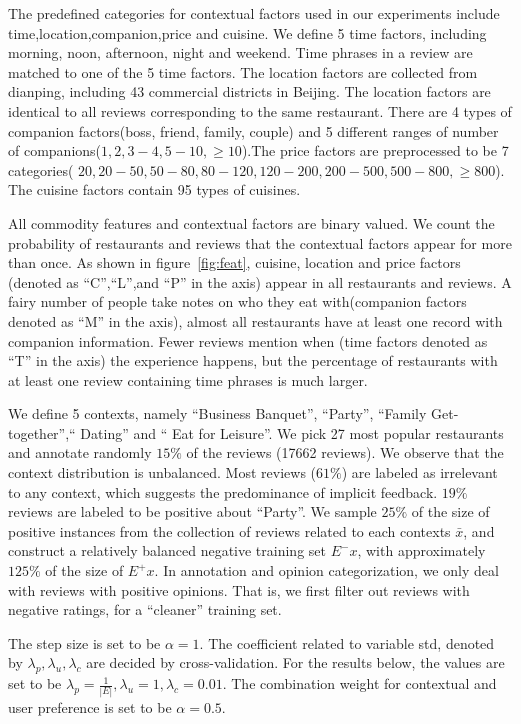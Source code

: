 \documentclass[sigconf]{acmart}
\begin{document}
The predefined categories for contextual factors used in our experiments include time,location,companion,price and cuisine. We define 5 time factors, including morning, noon, afternoon, night and weekend. Time phrases in a review are matched to one of the 5 time factors. The location factors are collected from dianping, including 43 commercial districts in Beijing. The location factors are identical to all reviews corresponding to the same restaurant. There are 4 types of companion factors(boss, friend, family, couple) and 5 different ranges of number of companions($1,2,3-4,5-10,\geq 10$).The price factors are preprocessed to be 7 categories( $20,20-50,50-80,80-120,120-200,200-500,500-800,\geq 800$). The cuisine factors contain 95 types of cuisines.

All commodity features and contextual factors are binary valued. We count the probability of restaurants and reviews that the contextual factors appear for more than once. As shown in figure~\ref{fig:feat}, cuisine, location and price factors (denoted as ``C'',``L'',and ``P'' in the axis) appear in all restaurants and reviews. A fairy number of people take notes on who they eat with(companion factors denoted as ``M'' in the axis), almost all restaurants have at least one record with companion information. Fewer reviews mention when (time factors denoted as ``T'' in the axis) the experience happens, but the percentage of restaurants with at least one review containing time phrases is much larger.

We define 5 contexts, namely ``Business Banquet'', ``Party'', ``Family Get-together'',`` Dating'' and `` Eat for Leisure''. We pick 27 most popular restaurants and annotate randomly $15\%$ of the reviews (17662 reviews). We observe that the context distribution is unbalanced. Most reviews ($61\%$) are labeled as irrelevant to any context, which suggests the predominance of implicit feedback. $19\%$ reviews are labeled to be positive about  ``Party''. We sample $25\%$ of the size of positive instances from the collection of reviews related to each contexts $\bar{x}$, and construct a relatively balanced negative training set  $E^{-}{x}$, with approximately $125\%$ of the size of $E^{+}{x}$. In annotation and opinion categorization, we only deal with reviews with positive opinions. That is, we first filter out reviews with negative ratings, for a ``cleaner'' training set. 

The step size is set to be $\alpha=1$. The coefficient related to variable std, denoted by $\lambda_p,\lambda_u,\lambda_c$ are decided by cross-validation. For the results below, the values are set to be $\lambda_p=\frac{1}{|E|},\lambda_u=1,\lambda_c=0.01$. The combination weight for contextual and user preference is set to be $\alpha=0.5$.
\end{document}
